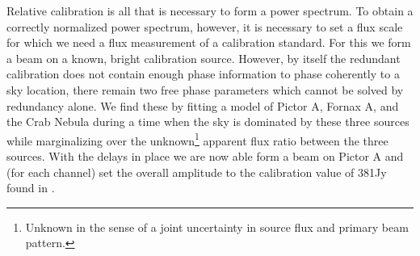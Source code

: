 \documentclass[preprint]{aastex}
\begin{document}
Relative calibration is all that is necessary to form a power spectrum. To obtain a correctly normalized power spectrum, however, it is necessary to set a flux scale for which we need a flux measurement of a calibration standard.  For this we form a beam on a known, bright calibration source.  However, by itself the redundant calibration does not contain enough phase information to phase coherently to a sky location, there remain two free phase parameters which cannot be solved by redundancy alone.   We find these by fitting a model of Pictor A, Fornax A, and the Crab Nebula during a time when the sky is dominated by these three sources while marginalizing over the unknown\footnote{Unknown in the sense of a joint uncertainty in source flux and primary beam pattern.} apparent flux ratio between the three sources. With the delays in place we are now able form a beam on Pictor A and (for each channel) set the overall amplitude to the calibration value of 381Jy found in \cite{jacobs:2013b}.
  
\end{document}
